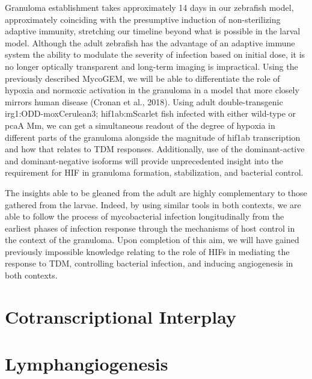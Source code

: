 Granuloma establishment takes approximately 14 days in our zebrafish model, approximately coinciding with the presumptive induction of non-sterilizing adaptive immunity, stretching our timeline beyond what is possible in the larval model. Although the adult zebrafish has the advantage of an adaptive immune system the ability to modulate the severity of infection based on initial dose, it is no longer optically transparent and long-term imaging is impractical. Using the previously described MycoGEM, we will be able to differentiate the role of hypoxia and normoxic activation in the granuloma in a model that more closely mirrors human disease (Cronan et al., 2018). Using adult double-transgenic irg1:ODD-moxCerulean3; hif1ab:mScarlet fish infected with either wild-type or pcaA Mm, we can get a simultaneous readout of the degree of hypoxia in different parts of the granuloma alongside the magnitude of hif1ab transcription and how that relates to TDM responses. Additionally, use of the dominant-active and dominant-negative isoforms will provide unprecedented insight into the requirement for HIF in granuloma formation, stabilization, and bacterial control. 

The insights able to be gleaned from the adult are highly complementary to those gathered from the larvae. Indeed, by using similar tools in both contexts, we are able to follow the process of mycobacterial infection longitudinally from the earliest phases of infection response through the mechanisms of host control in the context of the granuloma. Upon completion of this aim, we will have gained previously impossible knowledge relating to the role of HIFs in mediating the response to TDM, controlling bacterial infection, and inducing angiogenesis in both contexts.

\section{Cotranscriptional Interplay}


\section{Lymphangiogenesis}
